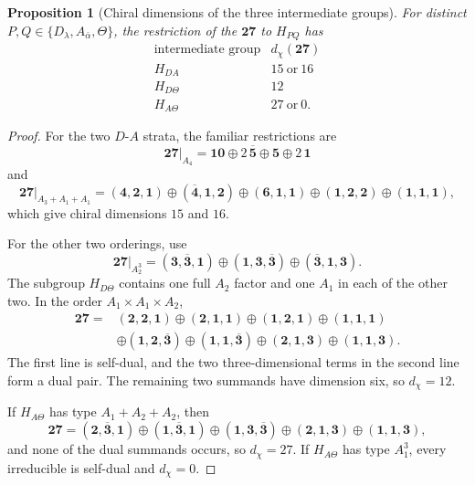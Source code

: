 \documentclass[11pt]{article}
\newtheorem{proposition}[theorem]{Proposition}
\theoremstyle{remark}
\begin{document}
\begin{proposition}[Chiral dimensions of the three intermediate groups]
\label{prop:pair-ordering}
For distinct \(P,Q\in\{D_\lambda,A_{\bar\alpha},\Theta\}\), the restriction of the
\(\mathbf{27}\) to \(H_{PQ}\) has
\[
\begin{array}{c|c}
\text{intermediate group} & d_\chi(\mathbf{27})\\
\hline
H_{DA} & 15\ \text{or}\ 16\\
H_{D\Theta} & 12\\
H_{A\Theta} & 27\ \text{or}\ 0.
\end{array}
\]
\end{proposition}
\begin{proof}
For the two \(D\)-\(A\) strata, the familiar restrictions are
\[
 \mathbf{27}|_{A_4}
 =\mathbf{10}\oplus2\,\overline{\mathbf5}
  \oplus\mathbf5\oplus2\,\mathbf1
\]
and
\[
 \mathbf{27}|_{A_3+A_1+A_1}
 =(\mathbf4,\mathbf2,\mathbf1)
 \oplus(\overline{\mathbf4},\mathbf1,\mathbf2)
 \oplus(\mathbf6,\mathbf1,\mathbf1)
 \oplus(\mathbf1,\mathbf2,\mathbf2)
 \oplus(\mathbf1,\mathbf1,\mathbf1),
\]
which give chiral dimensions \(15\) and \(16\).

For the other two orderings, use
\[
 \mathbf{27}|_{A_2^3}
 =(\mathbf3,\overline{\mathbf3},\mathbf1)
 \oplus(\mathbf1,\mathbf3,\overline{\mathbf3})
 \oplus(\overline{\mathbf3},\mathbf1,\mathbf3).
\]
The subgroup \(H_{D\Theta}\) contains one full \(A_2\) factor and one
\(A_1\) in each of the other two. In the order \(A_1\times A_1\times A_2\),
\[
\begin{aligned}
\mathbf{27}={}&(\mathbf2,\mathbf2,\mathbf1)
\oplus(\mathbf2,\mathbf1,\mathbf1)
\oplus(\mathbf1,\mathbf2,\mathbf1)
\oplus(\mathbf1,\mathbf1,\mathbf1)\\
&\oplus(\mathbf1,\mathbf2,\overline{\mathbf3})
\oplus(\mathbf1,\mathbf1,\overline{\mathbf3})
\oplus(\mathbf2,\mathbf1,\mathbf3)
\oplus(\mathbf1,\mathbf1,\mathbf3).
\end{aligned}
\]
The first line is self-dual, and the two three-dimensional terms in the
second line form a dual pair. The remaining two summands have dimension six,
so \(d_\chi=12\).

If \(H_{A\Theta}\) has type \(A_1+A_2+A_2\), then
\[
\mathbf{27}=(\mathbf2,\overline{\mathbf3},\mathbf1)
\oplus(\mathbf1,\overline{\mathbf3},\mathbf1)
\oplus(\mathbf1,\mathbf3,\overline{\mathbf3})
\oplus(\mathbf2,\mathbf1,\mathbf3)
\oplus(\mathbf1,\mathbf1,\mathbf3),
\]
and none of the dual summands occurs, so \(d_\chi=27\). If
\(H_{A\Theta}\) has type \(A_1^3\), every irreducible is self-dual and
\(d_\chi=0\).
\end{proof}
\end{document}
